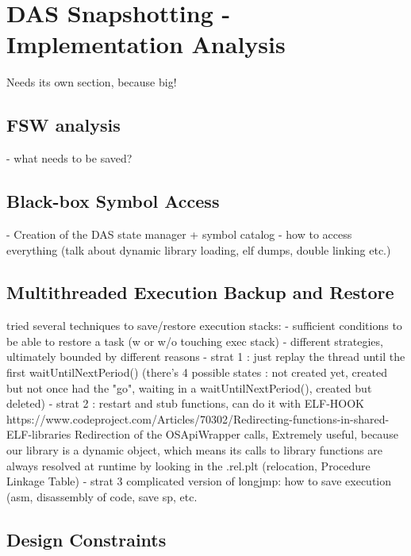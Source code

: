 {
\setlength{\parindent}{2em}
\chapter{DAS Snapshotting - Implementation Analysis}\label{cha:das-impl}
Needs its own section, because big!
\section{FSW analysis}
- what needs to be saved?
\section{Black-box Symbol Access}
- Creation of the DAS state manager + symbol catalog
- how to access everything (talk about dynamic library loading, elf dumps, double linking etc.)
\section{Multithreaded Execution Backup and Restore}
tried several techniques to save/restore execution stacks:
- sufficient conditions to be able to restore a task (w or w/o touching exec stack)
- different strategies, ultimately bounded by different reasons 
- strat 1 : just replay the thread until the first waitUntilNextPeriod() (there's 4 possible states : not created yet, created but not once had the "go", waiting in a waitUntilNextPeriod(), created but deleted)
- strat 2 : restart and stub functions, can do it with ELF-HOOK https://www.codeproject.com/Articles/70302/Redirecting-functions-in-shared-ELF-libraries
	Redirection of the OSApiWrapper calls, Extremely useful, because our library is a dynamic object, which means its calls to library functions are always resolved at runtime by looking in the .rel.plt (relocation, Procedure Linkage Table)
- strat 3 complicated version of longjmp: how to save execution (asm, disassembly of code, save sp, etc.%
\section{Design Constraints}

}